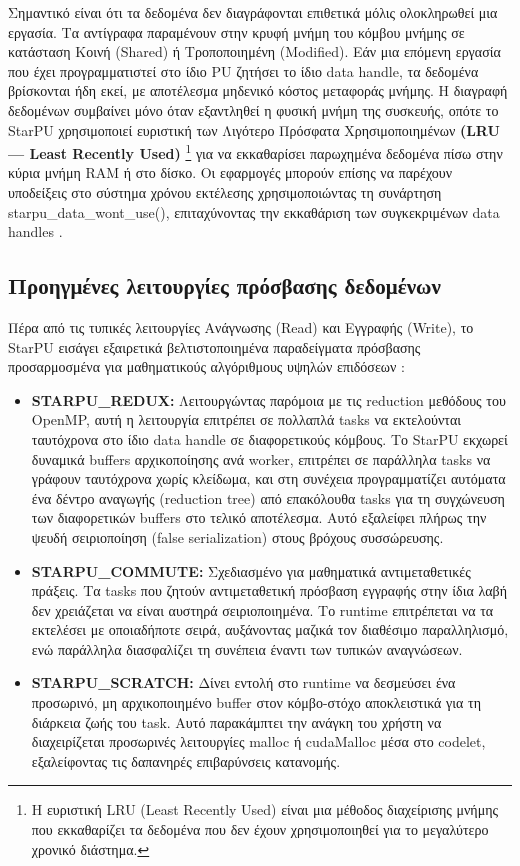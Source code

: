 Σημαντικό είναι ότι τα δεδομένα δεν διαγράφονται επιθετικά μόλις ολοκληρωθεί μια εργασία. Τα αντίγραφα παραμένουν στην κρυφή μνήμη του κόμβου μνήμης σε κατάσταση Κοινή (Shared) ή Τροποποιημένη (Modified). Εάν μια επόμενη εργασία που έχει προγραμματιστεί στο ίδιο PU ζητήσει το ίδιο data handle, τα δεδομένα βρίσκονται ήδη εκεί, με αποτέλεσμα μηδενικό κόστος μεταφοράς μνήμης. Η διαγραφή δεδομένων συμβαίνει μόνο όταν εξαντληθεί η φυσική μνήμη της συσκευής, οπότε το StarPU χρησιμοποιεί ευριστική των Λιγότερο Πρόσφατα Χρησιμοποιημένων \textbf{(LRU — Least Recently Used)} \footnote{Η ευριστική LRU (Least Recently Used) είναι μια μέθοδος διαχείρισης μνήμης που εκκαθαρίζει τα δεδομένα που δεν έχουν χρησιμοποιηθεί για το μεγαλύτερο χρονικό διάστημα.} για να εκκαθαρίσει παρωχημένα δεδομένα πίσω στην κύρια μνήμη RAM ή στο δίσκο. Οι εφαρμογές μπορούν επίσης να παρέχουν υποδείξεις στο σύστημα χρόνου εκτέλεσης χρησιμοποιώντας τη συνάρτηση starpu\_data\_wont\_use(), επιταχύνοντας την εκκαθάριση των συγκεκριμένων data handles \cite{starpu_website,aiken_cs315b_lec13,redis_cachecoherence}.

\subsection{Προηγμένες λειτουργίες πρόσβασης δεδομένων}

Πέρα από τις τυπικές λειτουργίες Ανάγνωσης (Read) και Εγγραφής (Write), το StarPU εισάγει εξαιρετικά βελτιστοποιημένα παραδείγματα πρόσβασης προσαρμοσμένα για μαθηματικούς αλγόριθμους υψηλών επιδόσεων \cite{starpu2025handbook, starpu_dev_manual}:

\begin{itemize}
  \item \textbf{STARPU\_REDUX:} Λειτουργώντας παρόμοια με τις reduction μεθόδους του OpenMP, αυτή η λειτουργία επιτρέπει σε πολλαπλά tasks να εκτελούνται ταυτόχρονα στο ίδιο data handle σε διαφορετικούς κόμβους. Το StarPU εκχωρεί δυναμικά buffers αρχικοποίησης ανά worker, επιτρέπει σε παράλληλα tasks να γράφουν ταυτόχρονα χωρίς κλείδωμα, και στη συνέχεια προγραμματίζει αυτόματα ένα δέντρο αναγωγής (reduction tree) από επακόλουθα tasks για τη συγχώνευση των διαφορετικών buffers στο τελικό αποτέλεσμα. Αυτό εξαλείφει πλήρως την ψευδή σειριοποίηση (false serialization) στους βρόχους συσσώρευσης.

  \item \textbf{STARPU\_COMMUTE:} Σχεδιασμένο για μαθηματικά αντιμεταθετικές πράξεις. Τα tasks που ζητούν αντιμεταθετική πρόσβαση εγγραφής στην ίδια λαβή δεν χρειάζεται να είναι αυστηρά σειριοποιημένα. Το runtime επιτρέπεται να τα εκτελέσει με οποιαδήποτε σειρά, αυξάνοντας μαζικά τον διαθέσιμο παραλληλισμό, ενώ παράλληλα διασφαλίζει τη συνέπεια έναντι των τυπικών αναγνώσεων.

  \item \textbf{STARPU\_SCRATCH:} Δίνει εντολή στο runtime να δεσμεύσει ένα προσωρινό, μη αρχικοποιημένο buffer στον κόμβο-στόχο αποκλειστικά για τη διάρκεια ζωής του task. Αυτό παρακάμπτει την ανάγκη του χρήστη να διαχειρίζεται προσωρινές λειτουργίες malloc ή cudaMalloc μέσα στο codelet, εξαλείφοντας τις δαπανηρές επιβαρύνσεις κατανομής.
\end{itemize}

